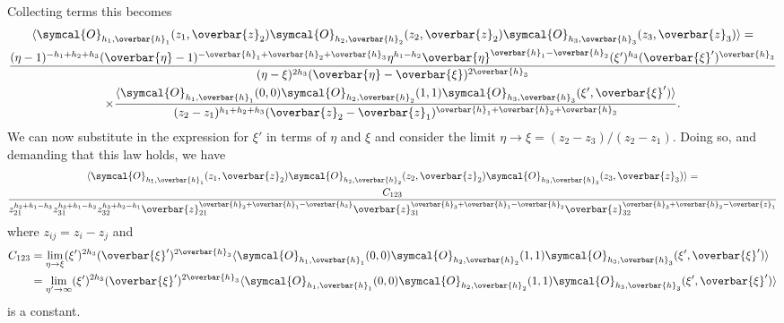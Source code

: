 \documentclass[fleqn]{NotesClass}
\newcommand{\quantumField}[1]{\symcal{#1}}
\DeclarePairedDelimiter{\correlator}{\langle}{\rangle}
\begin{document}
    Collecting terms this becomes
    \begin{multline}
        \correlator{\quantumField{O}_{h_1,\overbar{h}_1}(z_1, \overbar{z}_2) \quantumField{O}_{h_2,\overbar{h}_2}(z_2, \overbar{z}_2) \quantumField{O}_{h_3,\overbar{h}_3}(z_3, \overbar{z}_3)} =\\ 
        \frac{(\eta - 1)^{-h_1 + h_2 + h_3} (\overbar{\eta} - 1)^{-\overbar{h}_1 + \overbar{h}_2 + \overbar{h}_3} \eta^{h_1 - h_2} \overbar{\eta}^{\overbar{h}_1 - \overbar{h}_2} (\xi')^{h_3}(\overbar{\xi}')^{\overbar{h}_3}}{(\eta - \xi)^{2h_3}(\overbar{\eta} - \overbar{\xi})^{2\overbar{h}_3}}\\
        \times \frac{\correlator{\quantumField{O}_{h_1,\overbar{h}_1}(0, 0) \quantumField{O}_{h_2,\overbar{h}_2}(1, 1) \quantumField{O}_{h_3, \overbar{h}_3}(\xi', \overbar{\xi}')}}{(z_2 - z_1)^{h_1 + h_2 + h_3} (\overbar{z}_2 - \overbar{z}_1)^{\overbar{h}_1 + \overbar{h}_2 + \overbar{h}_3}}.
    \end{multline}
    We can now substitute in the expression for \(\xi'\) in terms of \(\eta\) and \(\xi\) and consider the limit \(\eta \to \xi = (z_2 - z_3)/(z_2 - z_1)\).
    Doing so, and demanding that this law holds, we have
    \begin{multline}
        \correlator{\quantumField{O}_{h_1,\overbar{h}_1}(z_1, \overbar{z}_2) \quantumField{O}_{h_2,\overbar{h}_2}(z_2, \overbar{z}_2) \quantumField{O}_{h_3,\overbar{h}_3}(z_3, \overbar{z}_3)} =\\
        \frac{C_{123}}{z_{21}^{h_2 + h_1 - h_3} z_{31}^{h_3 + h_1 - h_2} z_{32}^{h_3 + h_2 - h_1} \overbar{z}_{21}^{\overbar{h}_2 + \overbar{h}_1-\overbar{h_3}} \overbar{z}_{31}^{\overbar{h}_3 + \overbar{h}_1 - \overbar{h}_2} \overbar{z}_{32}^{\overbar{h}_3 + \overbar{h}_2 - \overbar{z}_1}}
    \end{multline}
    where \(z_{ij} = z_i - z_j\) and
    \begin{align}
        C_{123} &= \lim_{\eta \to \xi} (\xi')^{2h_3} (\overbar{\xi}')^{2\overbar{h}_3} \correlator{\quantumField{O}_{h_1,\overbar{h}_1}(0, 0) \quantumField{O}_{h_2, \overbar{h}_2}(1, 1) \quantumField{O}_{h_3, \overbar{h}_3}(\xi', \overbar{\xi}')}\\
        &= \lim_{\eta' \to \infty} (\xi')^{2h_3} (\overbar{\xi}')^{2\overbar{h}_3} \correlator{\quantumField{O}_{h_1,\overbar{h}_1}(0, 0) \quantumField{O}_{h_2, \overbar{h}_2}(1, 1) \quantumField{O}_{h_3, \overbar{h}_3}(\xi', \overbar{\xi}')}
    \end{align}
    is a constant.
    
\end{document}
